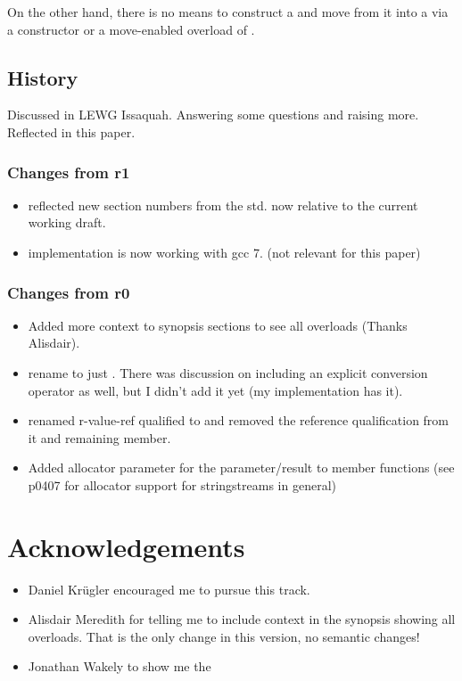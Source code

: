 \documentclass[ebook,11pt,article]{memoir}
\begin{document}
On the other hand, there is no means to construct a  and move from it into a  via a constructor or a move-enabled overload of .

\section{History}
Discussed in LEWG Issaquah. Answering some questions and raising more. Reflected in this paper.
\subsection{Changes from r1}
\begin{itemize}
\item reflected new section numbers from the std. now relative to the current working draft.
\item implementation is now working with gcc 7. (not relevant for this paper)
\end{itemize}

\subsection{Changes from r0}
\begin{itemize}
\item Added more context to synopsis sections to see all overloads (Thanks Alisdair).
\item rename  to just . There was discussion on including an explicit conversion operator as well, but I didn't add it yet (my implementation has it).
\item renamed r-value-ref qualified  to  and removed the reference qualification from it and remaining  member.
\item Added allocator parameter for the  parameter/result to member functions (see p0407 for allocator support for stringstreams in general)
\end{itemize}


\chapter{Acknowledgements}
\begin{itemize}
\item Daniel Kr\"ugler encouraged me to pursue this track.
\item Alisdair Meredith for telling me to include context in the synopsis showing all overloads. That is the only change in this version, no semantic changes!
\item Jonathan Wakely to show me the 
\end{itemize}
\end{document}
